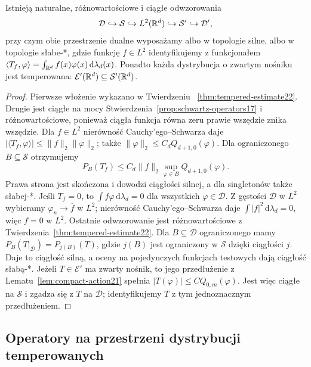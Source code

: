\begin{stwierdzenie}
\label{prop:schwartz-embeddings22}
Istnieją naturalne, różnowartościowe i ciągłe odwzorowania
\[
 \mathcal D\hookrightarrow\mathcal S\hookrightarrow
 L^2(\mathbb R^d)\hookrightarrow\mathcal S'\hookrightarrow\mathcal D',
\]
przy czym obie przestrzenie dualne wyposażamy albo
w topologie silne, albo w topologie słabe-*,
gdzie funkcję $f\in L^2$ identyfikujemy z funkcjonałem
$\langle T_f,\varphi\rangle=\int_{\mathbb R^d}f(x)\varphi(x)
\,\mathrm d\lambda_d(x)$.
Ponadto każda dystrybucja o zwartym nośniku jest temperowana:
$\mathcal E'(\mathbb R^d)\subseteq\mathcal S'(\mathbb R^d)$.
\end{stwierdzenie}
\begin{proof}
Pierwsze włożenie wykazano w Twierdzeniu~
\ref{thm:tempered-estimate22}. Drugie jest ciągłe na mocy
Stwierdzenia~\ref{prop:schwartz-operators17} i różnowartościowe,
ponieważ ciągła funkcja równa zeru prawie wszędzie znika
wszędzie. Dla $f\in L^2$ nierówność Cauchy'ego--Schwarza daje
$|\langle T_f,\varphi\rangle|\le\|f\|_2\|\varphi\|_2$;
także $\|\varphi\|_2\le C_dQ_{d+1,0}(\varphi)$.
Dla ograniczonego $B\subseteq\mathcal S$ otrzymujemy
\[
 P_B(T_f)\le C_d\|f\|_2\sup_{\varphi\in B}Q_{d+1,0}(\varphi).
\]
Prawa strona jest skończona i dowodzi ciągłości silnej,
a dla singletonów także słabej-*.
Jeśli $T_f=0$, to $\int f\varphi\,\mathrm d\lambda_d=0$
dla wszystkich $\varphi\in\mathcal D$.
Z gęstości $\mathcal D$ w $L^2$ wybieramy $\varphi_n\to
\overline f$ w $L^2$; nierówność Cauchy'ego--Schwarza daje
$\int |f|^2\,\mathrm d\lambda_d=0$, więc $f=0$ w $L^2$.
Ostatnie odwzorowanie jest różnowartościowe z
Twierdzenia~\ref{thm:tempered-estimate22}. Dla
$B\subseteq\mathcal D$ ograniczonego mamy
$P_B(T|_{\mathcal D})=P_{j(B)}(T)$, gdzie $j(B)$ jest
ograniczony w $\mathcal S$ dzięki ciągłości $j$.
Daje to ciągłość silną, a oceny na pojedynczych
funkcjach testowych dają ciągłość słabą-*.
Jeżeli $T\in\mathcal E'$ ma zwarty nośnik,
to jego przedłużenie z Lematu~\ref{lem:compact-action21}
spełnia $|T(\varphi)|\le C Q_{0,m}(\varphi)$.
Jest więc ciągłe na $\mathcal S$ i zgadza się z $T$
na $\mathcal D$; identyfikujemy $T$ z tym jednoznacznym
przedłużeniem.
\end{proof}

\subsection{Operatory na przestrzeni dystrybucji temperowanych}

